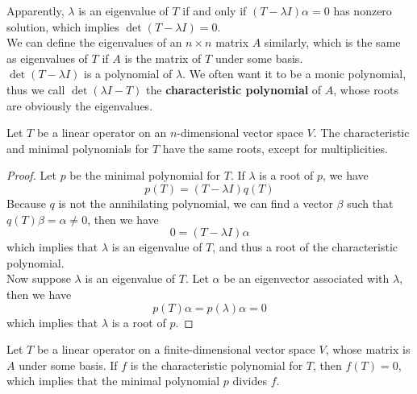 \documentclass{article}
\begin{document}
Apparently, $\lambda$ is an eigenvalue of $T$ if and only if $(T-\lambda I)\alpha=0$ has nonzero solution, which implies $\det(T-\lambda I)=0$.\\
\indent We can define the eigenvalues of an $n\times n$ matrix $A$ similarly, which is the same as eigenvalues of $T$ if $A$ is the matrix of $T$ under some basis.\\ 
\indent $\det (T-\lambda I)$ is a polynomial of $\lambda$. We often want it to be a monic polynomial, thus we call $\det(\lambda I-T)$ the \textbf{characteristic polynomial} of $A$, whose roots are obviously the eigenvalues.
\begin{thm}
	Let $T$ be a linear operator on an $n$-dimensional vector space $V$. The characteristic and minimal polynomials for $T$ have the same roots, except for multiplicities.  
\end{thm}
\begin{proof}
	Let $p$ be the minimal polynomial for $T$. If $\lambda$ is a root of $p$, we have
	\[p(T)=(T-\lambda I)q(T)\]
	Because $q$ is not the annihilating polynomial, we can find a vector $\beta$ such that $q(T)\beta=\alpha\neq0$, then we have
	\[0=(T-\lambda I)\alpha\]
	which implies that $\lambda$ is an eigenvalue of $T$, and thus a root of the characteristic polynomial.\\
	Now suppose $\lambda$ is an eigenvalue of $T$. Let $\alpha$ be an eigenvector associated with $\lambda$, then we have
	\[p(T)\alpha=p(\lambda)\alpha=0\]
	which implies that $\lambda$ is a root of $p$.
\end{proof}
\begin{thm}\label{CayleyHamilton}
	Let $T$ be a linear operator on a finite-dimensional vector space $V$, whose matrix is $A$ under some basis. If $f$ is the characteristic polynomial for $T$, then $f(T)=0$, which implies that the minimal polynomial $p$ divides $f$.
\end{thm}
\end{document}

